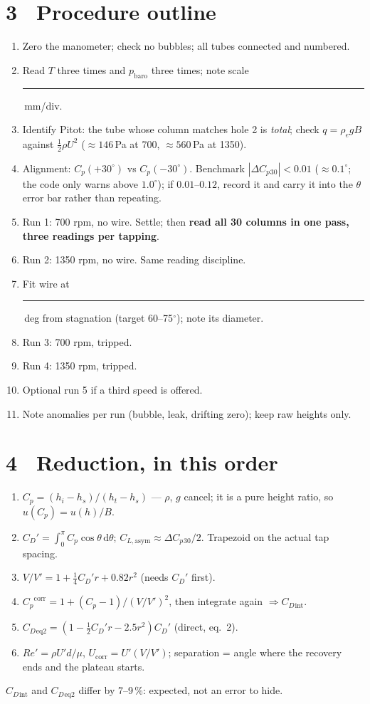 \documentclass[9pt,a4paper]{extarticle}
\newcommand{\Cp}{\ensuremath{C_p}}
\newcommand{\CD}{\ensuremath{C_D}}
\newcommand{\ReD}{\ensuremath{\mathit{Re}}}
\newcommand{\blank}{\rule{1.5cm}{0.4pt}}
\begin{document}
\section*{3 \ Procedure outline}
\begin{enumerate}[leftmargin=1.3em,itemsep=0pt,topsep=1pt]
\item Zero the manometer; check no bubbles; all tubes connected and numbered.
\item Read $T$ three times and $p_{\text{baro}}$ three times; note scale \blank\,mm/div.
\item Identify Pitot: the tube whose column matches hole 2 is \emph{total}; check
$q=\rho_e g B$ against $\tfrac12\rho U^2$ ($\approx146$\,Pa at 700, $\approx560$\,Pa at 1350).
\item Alignment: $\Cp(+30^\circ)$ vs $\Cp(-30^\circ)$. Benchmark $|\Delta\Cp{}_{30}|<0.01$
($\approx0.1^\circ$; the code only warns above $1.0^\circ$); if $0.01$--$0.12$, record it and
carry it into the $\theta$ error bar rather than repeating.
\item Run 1: 700 rpm, no wire. Settle; then \textbf{read all 30 columns in one pass,
three readings per tapping}.
\item Run 2: 1350 rpm, no wire. Same reading discipline.
\item Fit wire at \blank\,deg from stagnation (target 60--75$^\circ$); note its diameter.
\item Run 3: 700 rpm, tripped. \quad \item Run 4: 1350 rpm, tripped.
\item Optional run 5 if a third speed is offered.
\item Note anomalies per run (bubble, leak, drifting zero); keep raw heights only.
\end{enumerate}

\section*{4 \ Reduction, in this order}
\begin{enumerate}[leftmargin=1.3em,itemsep=0pt,topsep=1pt]
\item $\Cp = (h_i-h_s)/(h_t-h_s)$ --- $\rho$, $g$ cancel; it is a pure height ratio,
so $u(\Cp)=u(h)/B$.
\item $\CD' = \int_0^{\pi}\Cp\cos\theta\,\mathrm{d}\theta$;
$\ensuremath{C_{L,\text{asym}}}\approx \Delta\Cp{}_{30}/2$. Trapezoid on the actual tap spacing.
\item $V/V' = 1 + \tfrac14\CD' r + 0.82 r^2$ \quad (needs $\CD'$ first).
\item $\Cp^{\text{corr}} = 1 + (\Cp-1)/(V/V')^2$, then integrate again $\Rightarrow \CD{}_{\text{int}}$.
\item $\CD{}_{\text{eq2}} = (1-\tfrac12\CD' r - 2.5 r^2)\CD'$ (direct, eq.~2).
\item $\ReD' = \rho U' d/\mu$, $U_{\text{corr}} = U'(V/V')$; separation = angle where the
recovery ends and the plateau starts.
\end{enumerate}
$\CD{}_{\text{int}}$ and $\CD{}_{\text{eq2}}$ differ by 7--9\,\%: expected, not an error to hide.
\end{document}
